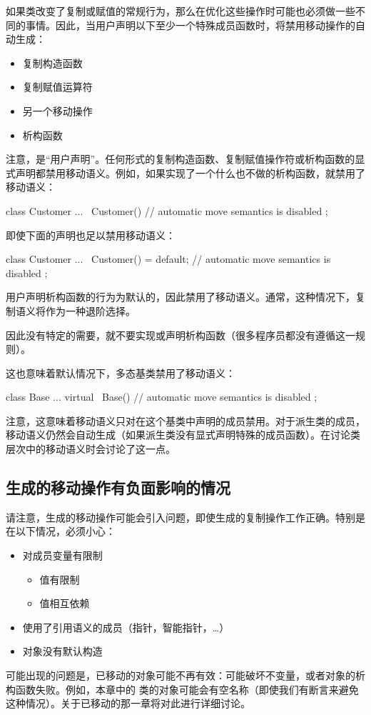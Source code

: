 如果类改变了复制或赋值的常规行为，那么在优化这些操作时可能也必须做一些不同的事情。因此，当用户声明以下至少一个特殊成员函数时，将禁用移动操作的自动生成：

\begin{itemize}
	\item 复制构造函数
	\item 复制赋值运算符
	\item 另一个移动操作
	\item 析构函数
\end{itemize}

注意，是“用户声明”。任何形式的复制构造函数、复制赋值操作符或析构函数的显式声明都禁用移动语义。例如，如果实现了一个什么也不做的析构函数，就禁用了移动语义：

\begin{cppcode}
class Customer {
	...
	~Customer() { // automatic move semantics is disabled
	}
};
\end{cppcode}

即使下面的声明也足以禁用移动语义：

\begin{cppcode}
class Customer {
	...
	~Customer() = default; // automatic move semantics is disabled
};
\end{cppcode}

用户声明析构函数的行为为默认的，因此禁用了移动语义。通常，这种情况下，复制语义将作为一种退阶选择。

因此没有特定的需要，就不要实现或声明析构函数（很多程序员都没有遵循这一规则）。

这也意味着默认情况下，多态基类禁用了移动语义：

\begin{cppcode}
class Base {
	...
	virtual ~Base() { // automatic move semantics is disabled
	}
};
\end{cppcode}

注意，这意味着移动语义只对在这个基类中声明的成员禁用。对于派生类的成员，移动语义仍然会自动生成（如果派生类没有显式声明特殊的成员函数）。在讨论类层次中的移动语义时会讨论了这一点。

\subsection{生成的移动操作有负面影响的情况}

请注意，生成的移动操作可能会引入问题，即使生成的复制操作工作正确。特别是在以下情况，必须小心：

\begin{itemize}
	\item 对成员变量有限制
	\begin{itemize}
		\item 值有限制
		\item 值相互依赖
	\end{itemize}
	\item 使用了引用语义的成员（指针，智能指针，…）
	\item 对象没有默认构造
\end{itemize}

可能出现的问题是，已移动的对象可能不再有效：可能破坏不变量，或者对象的析构函数失败。例如，本章中的  类的对象可能会有空名称（即使我们有断言来避免这种情况）。关于已移动的那一章将对此进行详细讨论。











